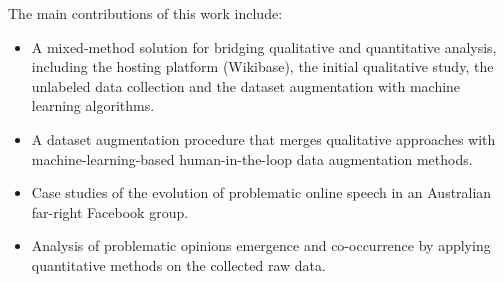 The main contributions of this work include:
\begin{itemize}
    \item A mixed-method solution for bridging qualitative and quantitative analysis, including the hosting platform (Wikibase), the initial qualitative study, the unlabeled data collection and the dataset augmentation with machine learning algorithms.
    \item A dataset augmentation procedure that merges qualitative approaches with machine-learning-based human-in-the-loop data augmentation methods.
    \item Case studies of the evolution of problematic online speech in an Australian far-right Facebook group.
    \item Analysis of problematic opinions emergence and co-occurrence by applying quantitative methods on the collected raw data.
\end{itemize}